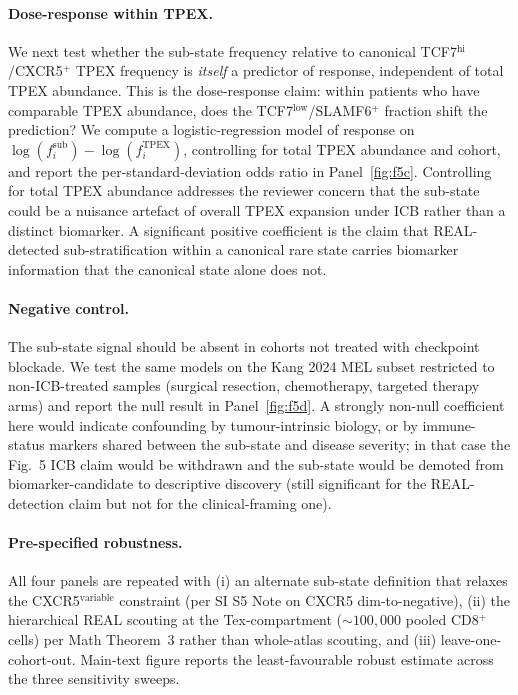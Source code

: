 \paragraph{Dose-response within TPEX.}
We next test whether the sub-state frequency relative to canonical TCF7$^{\text{hi}}$/CXCR5$^{+}$ TPEX frequency is \emph{itself} a predictor of response, independent of total TPEX abundance. This is the dose-response claim: within patients who have comparable TPEX abundance, does the TCF7$^{\text{low}}$/SLAMF6$^{+}$ fraction shift the prediction? We compute a logistic-regression model of response on $\log(f^{\text{sub}}_i) - \log(f^{\text{TPEX}}_i)$, controlling for total TPEX abundance and cohort, and report the per-standard-deviation odds ratio in Panel~\ref{fig:f5c}. Controlling for total TPEX abundance addresses the reviewer concern that the sub-state could be a nuisance artefact of overall TPEX expansion under ICB rather than a distinct biomarker. A significant positive coefficient is the claim that REAL-detected sub-stratification within a canonical rare state carries biomarker information that the canonical state alone does not.

\paragraph{Negative control.}
The sub-state signal should be absent in cohorts not treated with checkpoint blockade. We test the same models on the Kang 2024 MEL subset restricted to non-ICB-treated samples (surgical resection, chemotherapy, targeted therapy arms) and report the null result in Panel~\ref{fig:f5d}. A strongly non-null coefficient here would indicate confounding by tumour-intrinsic biology, or by immune-status markers shared between the sub-state and disease severity; in that case the Fig.~5 ICB claim would be withdrawn and the sub-state would be demoted from biomarker-candidate to descriptive discovery (still significant for the REAL-detection claim but not for the clinical-framing one).

\paragraph{Pre-specified robustness.}
All four panels are repeated with (i) an alternate sub-state definition that relaxes the CXCR5$^{\text{variable}}$ constraint (per SI S5 Note on CXCR5 dim-to-negative), (ii) the hierarchical REAL scouting at the Tex-compartment ($\sim 100{,}000$ pooled CD8$^{+}$ cells) per Math Theorem~3 rather than whole-atlas scouting, and (iii) leave-one-cohort-out. Main-text figure reports the least-favourable robust estimate across the three sensitivity sweeps.

